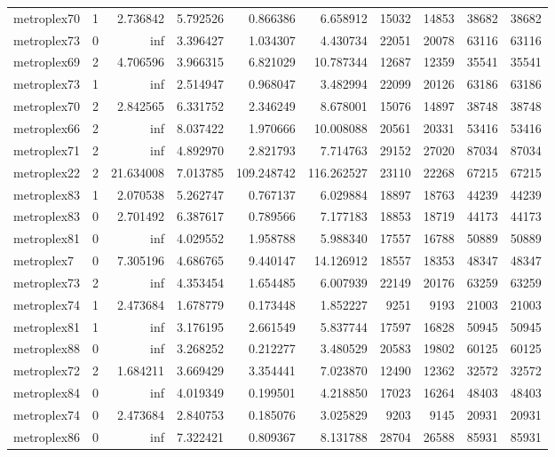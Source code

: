 \begin{longtable}{|l|r|r|r|r|r|r|r|r|r|}
metroplex70 & 1 & 2.736842 & 5.792526 & 0.866386 & 6.658912 & 15032 & 14853 & 38682 & 38682 \\
metroplex73 & 0 & inf & 3.396427 & 1.034307 & 4.430734 & 22051 & 20078 & 63116 & 63116 \\
metroplex69 & 2 & 4.706596 & 3.966315 & 6.821029 & 10.787344 & 12687 & 12359 & 35541 & 35541 \\
metroplex73 & 1 & inf & 2.514947 & 0.968047 & 3.482994 & 22099 & 20126 & 63186 & 63186 \\
metroplex70 & 2 & 2.842565 & 6.331752 & 2.346249 & 8.678001 & 15076 & 14897 & 38748 & 38748 \\
metroplex66 & 2 & inf & 8.037422 & 1.970666 & 10.008088 & 20561 & 20331 & 53416 & 53416 \\
metroplex71 & 2 & inf & 4.892970 & 2.821793 & 7.714763 & 29152 & 27020 & 87034 & 87034 \\
metroplex22 & 2 & 21.634008 & 7.013785 & 109.248742 & 116.262527 & 23110 & 22268 & 67215 & 67215 \\
metroplex83 & 1 & 2.070538 & 5.262747 & 0.767137 & 6.029884 & 18897 & 18763 & 44239 & 44239 \\
metroplex83 & 0 & 2.701492 & 6.387617 & 0.789566 & 7.177183 & 18853 & 18719 & 44173 & 44173 \\
metroplex81 & 0 & inf & 4.029552 & 1.958788 & 5.988340 & 17557 & 16788 & 50889 & 50889 \\
metroplex7 & 0 & 7.305196 & 4.686765 & 9.440147 & 14.126912 & 18557 & 18353 & 48347 & 48347 \\
metroplex73 & 2 & inf & 4.353454 & 1.654485 & 6.007939 & 22149 & 20176 & 63259 & 63259 \\
metroplex74 & 1 & 2.473684 & 1.678779 & 0.173448 & 1.852227 & 9251 & 9193 & 21003 & 21003 \\
metroplex81 & 1 & inf & 3.176195 & 2.661549 & 5.837744 & 17597 & 16828 & 50945 & 50945 \\
metroplex88 & 0 & inf & 3.268252 & 0.212277 & 3.480529 & 20583 & 19802 & 60125 & 60125 \\
metroplex72 & 2 & 1.684211 & 3.669429 & 3.354441 & 7.023870 & 12490 & 12362 & 32572 & 32572 \\
metroplex84 & 0 & inf & 4.019349 & 0.199501 & 4.218850 & 17023 & 16264 & 48403 & 48403 \\
metroplex74 & 0 & 2.473684 & 2.840753 & 0.185076 & 3.025829 & 9203 & 9145 & 20931 & 20931 \\
metroplex86 & 0 & inf & 7.322421 & 0.809367 & 8.131788 & 28704 & 26588 & 85931 & 85931 \\

\end{longtable}
